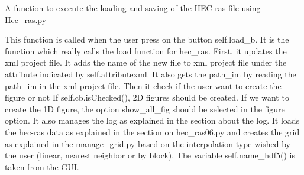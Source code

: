 \documentclass[letterpaper,10pt,english]{sphinxmanual}
\begin{document}
\begin{fulllineitems}
\begin{fulllineitems}
\end{fulllineitems}


\begin{fulllineitems}
\label{\detokenize{index:src_GUI.hydro_GUI_2.HEC_RAS1D.load_hec_ras_gui}}
A function to execute the loading and saving of the HEC-ras file using Hec\_ras.py


This function is called when the user press on the button self.load\_b. It is the function which really
calls the load function for hec\_ras. First, it updates the xml project file. It adds the name of the new file
to xml project file under the attribute indicated by self.attributexml. It also gets the path\_im by reading the
path\_im in the xml project file. Then it check if the user want to create the figure or not
If self.cb.isChecked(), 2D figures should be created. If we want to create the 1D figure, the option show\_all\_fig
should be selected in the figure option. It also manages the log as explained in the section about the log.
It loads the hec-ras data as explained in the section on hec\_ras06.py and creates the grid as explained
in the manage\_grid.py based on the interpolation type wished by the user (linear, nearest neighbor or by block).
The variable self.name\_hdf5() is taken from the GUI.

\end{fulllineitems}


\end{fulllineitems}

\end{document}
